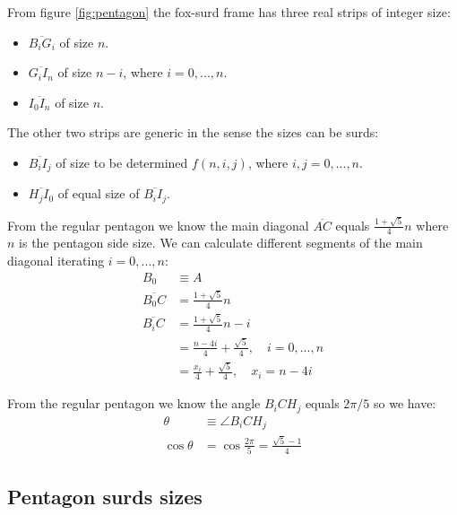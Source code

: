 \documentclass[11pt]{article}
\begin{document}
From figure \ref{fig:pentagon} the fox-surd frame has three real strips of integer size:
\begin{itemize}
    \item $\overline{B_iG_i}$ of size $n$.
    \item $\overline{G_iI_n}$ of size $n-i$, where $i = 0,...,n$.
    \item $\overline{I_0I_n}$ of size $n$.
\end{itemize}
The other two strips are generic in the sense the sizes can be surds:
\begin{itemize}
	\item $\overline{B_iI_j}$ of size to be determined $f(n,i,j)$, where $i,j = 0,...,n$.
	\item $\overline{H_jI_0}$ of equal size of $\overline{B_iI_j}$.
\end{itemize}

From the regular pentagon we know the main diagonal $\overline{AC}$ equals
$\frac{1+\sqrt{5}}{4}n$ where $n$ is the pentagon side size. We can calculate different
segments of the main diagonal iterating $i = 0,...,n$:
\begin{align}
B_0 &\equiv A \nonumber\\
\overline{B_0C} &= \frac{1+\sqrt{5}}{4}n \\
\overline{B_iC} &= \frac{1+\sqrt{5}}{4}n - i \nonumber\\
 &= \frac{n-4i}{4} + \frac{\sqrt{5}}{4}, \quad i = 0, ..., n \nonumber\\
 &= \frac{x_i}{4} + \frac{\sqrt{5}}{4}, \quad x_i = n - 4i \label{eq:B_iC}
\end{align}

From the regular pentagon we know the angle ${B_iCH_j}$ equals $2\pi / 5$ so we have:
\begin{align}
\theta &\equiv \angle{B_iCH_j} \\
\cos\theta &= \cos\frac{2\pi}{5} = \frac{\sqrt{5}-1}{4} \label{eq:cosine}
\end{align}

\subsection{Pentagon surds sizes}
\end{document}
